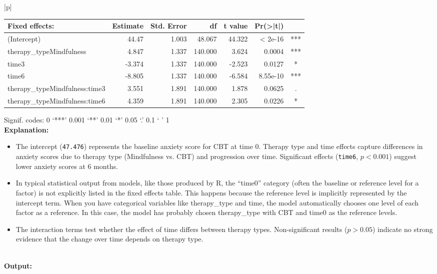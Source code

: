 {\begin{longtable}{|p{\linewidth}|}
\begin{tabular}{lrrrrrc}
\textbf{Fixed effects:} & \textbf{Estimate} & \textbf{Std. Error} & \textbf{df} & \textbf{t value} & \textbf{Pr(>|t|)} \\
\hline
(Intercept) & 44.47 & 1.003 & 48.067 & 44.322 & < 2e-16 & ***\\
therapy\_typeMindfulness & 4.847 & 1.337 & 140.000 & 3.624 & 0.0004 & ***\\
time3 & -3.374 & 1.337 & 140.000 & -2.523 & 0.0127 & * \\
time6 & -8.805 & 1.337 & 140.000 & -6.584 & 8.55e-10 & *** \\
therapy\_typeMindfulness:time3 & 3.551 & 1.891 & 140.000 & 1.878 & 0.0625 & . \\
therapy\_typeMindfulness:time6 & 4.359 & 1.891 & 140.000 & 2.305 & 0.0226 & * \\
\hline
\end{tabular}\newline
Signif. codes:  0 ‘***’ 0.001 ‘**’ 0.01 ‘*’ 0.05 ‘.’ 0.1 ‘ ’ 1 \\ 
\hline
\textbf{Explanation:} \newline 
\begin{itemize}
\item The intercept (\texttt{47.476}) represents the baseline anxiety score for CBT at time 0. Therapy type and time effects capture differences in anxiety scores due to therapy type (Mindfulness vs. CBT) and progression over time. Significant effects (\texttt{time6}, \(p < 0.001\)) suggest lower anxiety scores at 6 months.
\item In typical statistical output from models, like those produced by R, the ``time0'' category (often the baseline or reference level for a factor) is not explicitly listed in the fixed effects table. This happens because the reference level is implicitly represented by the intercept term.  When you have categorical variables like therapy\_type and time, the model automatically chooses one level of each factor as a reference. In this case, the model has probably chosen therapy\_type with CBT and time0 as the reference levels.
\item The interaction terms test whether the effect of time differs between therapy types. Non-significant results (\(p > 0.05\)) indicate no strong evidence that the change over time depends on therapy type.\end{itemize}\\
\hline
{}
\textbf{Output:} \newline 

\end{longtable}}
